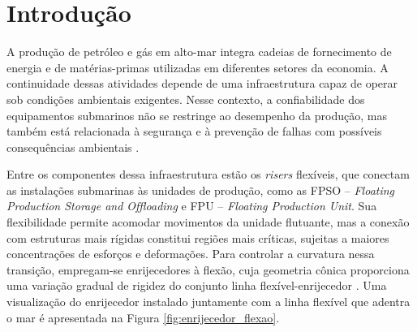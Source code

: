 \documentclass[arial,centeredequations,english,brazilian,oneside,section=TITLE]{ifes8}
\begin{document}
\imprimirsumario
\cleardoublepage


\textual


\setlength{\afterchapskip}{0\baselineskip}

\chapter{Introdução}
\label{cha:introducao}

A produção de petróleo e gás em alto-mar integra cadeias de fornecimento de energia e de matérias-primas 
utilizadas em diferentes setores da economia. A continuidade dessas atividades depende de uma infraestrutura
capaz de operar sob condições ambientais exigentes. Nesse contexto, a confiabilidade dos equipamentos submarinos
não se restringe ao desempenho da produção, mas também está relacionada à segurança e à prevenção de falhas com
possíveis consequências ambientais \cite{ANP2023}.


Entre os componentes dessa infraestrutura estão os \emph{risers} flexíveis, que conectam as instalações 
submarinas às unidades de produção, como as FPSO -- \emph{Floating Production Storage and Offloading} e 
FPU -- \emph{Floating Production Unit}. Sua flexibilidade permite acomodar movimentos da unidade flutuante, mas
a conexão com estruturas mais rígidas constitui regiões mais críticas, sujeitas a maiores concentrações de 
esforços e deformações. Para controlar a curvatura nessa transição, empregam-se enrijecedores à flexão, cuja 
geometria cônica proporciona uma variação gradual de rigidez do conjunto linha flexível-enrijecedor 
\cite{Caire2011,Lopes2025}. Uma visualização do enrijecedor instalado juntamente com a linha flexível que 
adentra o mar é apresentada na Figura \ref{fig:enrijecedor_flexao}.
\end{document}
